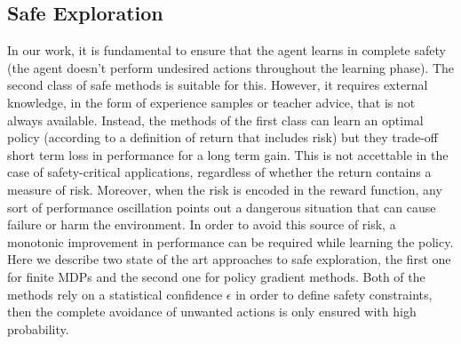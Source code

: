 \subsection{Safe Exploration} \label{subsec:safeexp}
In our work, it is fundamental to ensure that the agent learns in complete safety (\ie the agent doesn't perform undesired actions throughout the learning phase). The second class of safe methods is suitable for this. However, it requires external knowledge, in the form of experience samples or teacher advice, that is not always available. Instead, the methods of the first class can learn an optimal policy (according to a definition of return that includes risk) but they trade-off short term loss in performance for a long term gain. This is not accettable in the case of safety-critical applications, regardless of whether the return contains a measure of risk. Moreover, when the risk is encoded in the reward function, any sort of performance oscillation points out a dangerous situation that can cause failure or harm the environment. In order to avoid this source of risk, a monotonic improvement in performance can be required while learning the policy. Here we describe two state of the art approaches to safe exploration, the first one for finite \ac{MDPs} and the second one for policy gradient methods. Both of the methods rely on a statistical confidence $\epsilon$ in order to define safety constraints, then the complete avoidance of unwanted actions is only ensured with high probability. 


